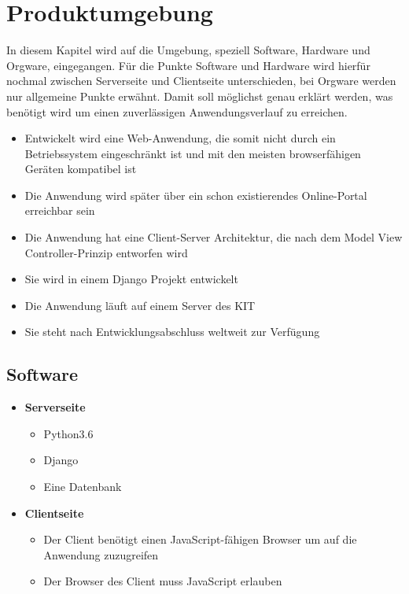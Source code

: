 
\chapter{Produktumgebung}

In diesem Kapitel wird auf die Umgebung, speziell Software, Hardware und Orgware, eingegangen. Für die Punkte Software und Hardware wird hierfür nochmal zwischen Serverseite und Clientseite unterschieden, bei \Gls{Orgware} werden nur allgemeine Punkte erwähnt. Damit soll möglichst genau erklärt werden, was benötigt wird um einen zuverlässigen Anwendungsverlauf zu erreichen.

\begin{itemize}
    \item Entwickelt wird eine Web-Anwendung, die somit nicht durch ein Betriebssystem eingeschränkt ist und mit den meisten browserfähigen Geräten kompatibel ist
    \item Die Anwendung wird später über ein schon existierendes Online-Portal erreichbar sein
    \item Die Anwendung hat eine Client-Server Architektur, die nach dem \Gls{Model View Controller}-Prinzip entworfen wird
    \item Sie wird in einem \Gls{Django} Projekt entwickelt
    \item Die Anwendung läuft auf einem \Gls{Server} des KIT
    \item Sie steht nach Entwicklungsabschluss weltweit zur Verfügung
\end{itemize}

\section{Software}

\begin{itemize}
    \item \textbf{Serverseite}
        \begin{itemize}
            \item Python3.6
            \item Django
            \item Eine Datenbank
        \end{itemize}
    \item \textbf{Clientseite}
        \begin{itemize}
            \item Der \Gls{Client} benötigt einen \Gls{JavaScript}-fähigen Browser um auf die Anwendung zuzugreifen
            \item Der Browser des Client muss JavaScript erlauben
        \end{itemize}
\end{itemize}

